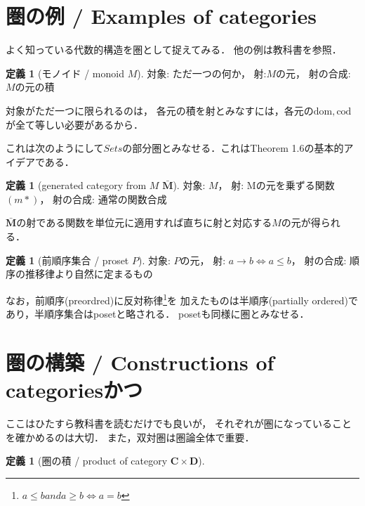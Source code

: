 \documentclass[a4j]{jarticle}
\newcommand {\cat}[1]{%
\mathbf{#1}%
}
\theoremstyle{definition}
\newtheorem{definition}[theorem]{定義}
\begin{document}
    \section{圏の例 / Examples of categories}
        よく知っている代数的構造を圏として捉えてみる．
        他の例は教科書を参照．

        \begin{definition}[モノイド / monoid $M$]
            対象: ただ一つの何か，
            射:$ M$の元，
            射の合成: $M$の元の積
        \end{definition}
        対象がただ一つに限られるのは，
        各元の積を射とみなすには，各元の$\mathrm{dom}, \mathrm{cod}$が全て等しい必要があるから．

        これは次のようにして$Sets$の部分圏とみなせる．これはTheorem 1.6の基本的アイデアである．

        \begin{definition}[generated category from $M$ $\cat{\bar{M}}$]
            対象: $M$，
            射: Mの元を乗ずる関数$(m \ast)$，
            射の合成: 通常の関数合成
        \end{definition}
        $\cat{\bar{M}}$の射である関数を単位元に適用すれば直ちに射と対応する$M$の元が得られる．

        \begin{definition}[前順序集合 / proset $P$]
            対象: $P$の元，
            射: $a \rightarrow b \Leftrightarrow a \leq b$，
            射の合成: 順序の推移律より自然に定まるもの
        \end{definition}

        なお，前順序(preordred)に反対称律\footnote{$ a \leq b and a \geq b \Leftrightarrow a=b$}を
        加えたものは半順序(partially ordered)であり，半順序集合はposetと略される．
        posetも同様に圏とみなせる．

    \newpage

    \section{圏の構築 / Constructions of categoriesかつ}
        ここはひたすら教科書を読むだけでも良いが，
        それぞれが圏になっていることを確かめるのは大切．
        また，双対圏は圏論全体で重要．

        \begin{definition}[圏の積 / product of category $\cat{C} \times \cat{D}$]
        \end{definition}
\end{document}
